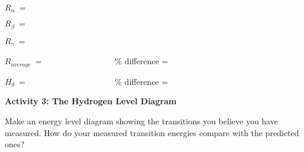 \noindent $R_\alpha ~ = ~\qquad\qquad\qquad\qquad\qquad$

\vspace{0.4in}

\noindent $R_\beta ~ = ~\qquad\qquad\qquad\qquad\qquad$

\vspace{0.4in}

\noindent $R_\gamma ~ =~ \qquad\qquad\qquad\qquad\qquad$

\vspace{0.4in}

\noindent $R_{average} ~ =~ \qquad\qquad\qquad\qquad$  \% difference = 

\vspace{0.4in}

\noindent $H_\delta ~ = ~\qquad\qquad\qquad\qquad\qquad$  \% difference =

\vspace{0.2in}


\textbf{Activity 3: The Hydrogen Level Diagram}

\bigskip
 
Make an energy level diagram showing the transitions you believe you have measured. 
How do your measured transition energies compare with the predicted ones?

